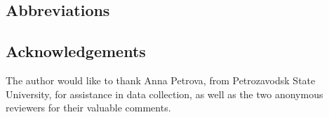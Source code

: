 \documentclass[output=paper]{langsci/langscibook}
\begin{document}
% 
% 
% 
% 
% 
% 
% 
% 
% 
% 
% 
% 
% 
% 
% 
% 
% 
% 
% 
% 
% 
% 
% 
% 
% 
% 
% 
% 
% 
% 
% 
% 
% 
% 
% 
% 


\subsection*{Abbreviations}
\subsection*{Acknowledgements}
The author would like to thank Anna Petrova, from Petrozavodsk State University, for assistance in data collection, as well as the two anonymous reviewers for their valuable comments.
\printbibliography[heading=subbibliography,notkeyword=this]
\end{document}
